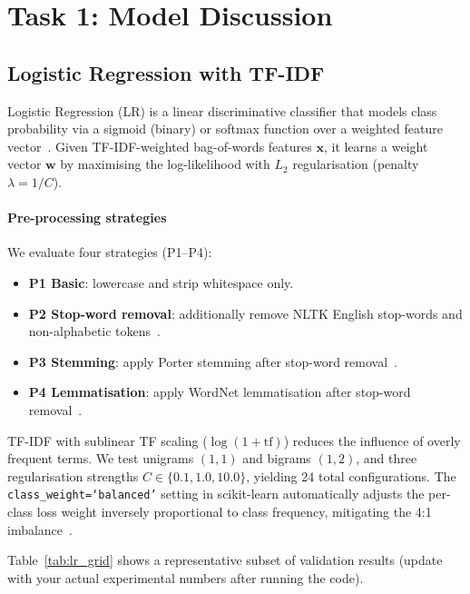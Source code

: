 \documentclass[10pt,twocolumn]{article}
\begin{document}
\section{Task 1: Model Discussion}
\label{sec:task1}

\subsection{Logistic Regression with TF-IDF}
\label{ssec:lr}

Logistic Regression (LR) is a linear discriminative classifier that
models class probability via a sigmoid (binary) or softmax function over
a weighted feature vector~\citep{bishop2006pattern}.
Given TF-IDF-weighted bag-of-words features $\mathbf{x}$, it learns a
weight vector $\mathbf{w}$ by maximising the log-likelihood with
$L_2$ regularisation (penalty $\lambda = 1/C$).

\paragraph{Pre-processing strategies}
We evaluate four strategies (P1--P4):

\begin{itemize}
  \item \textbf{P1 Basic}: lowercase and strip whitespace only.
  \item \textbf{P2 Stop-word removal}: additionally remove NLTK English
    stop-words and non-alphabetic tokens~\citep{bird2009natural}.
  \item \textbf{P3 Stemming}: apply Porter stemming after stop-word
    removal~\citep{porter1980algorithm}.
  \item \textbf{P4 Lemmatisation}: apply WordNet lemmatisation after
    stop-word removal~\citep{miller1995wordnet}.
\end{itemize}

TF-IDF with sublinear TF scaling ($\log(1+\mathrm{tf})$) reduces the
influence of overly frequent terms.
We test unigrams $(1,1)$ and bigrams $(1,2)$, and three regularisation
strengths $C \in \{0.1, 1.0, 10.0\}$, yielding 24 total configurations.
The \texttt{class\_weight=`balanced'} setting in scikit-learn automatically
adjusts the per-class loss weight inversely proportional to class frequency,
mitigating the 4:1 imbalance~\citep{pedregosa2011scikit}.

Table~\ref{tab:lr_grid} shows a representative subset of validation results
(update with your actual experimental numbers after running the code).
\end{document}
